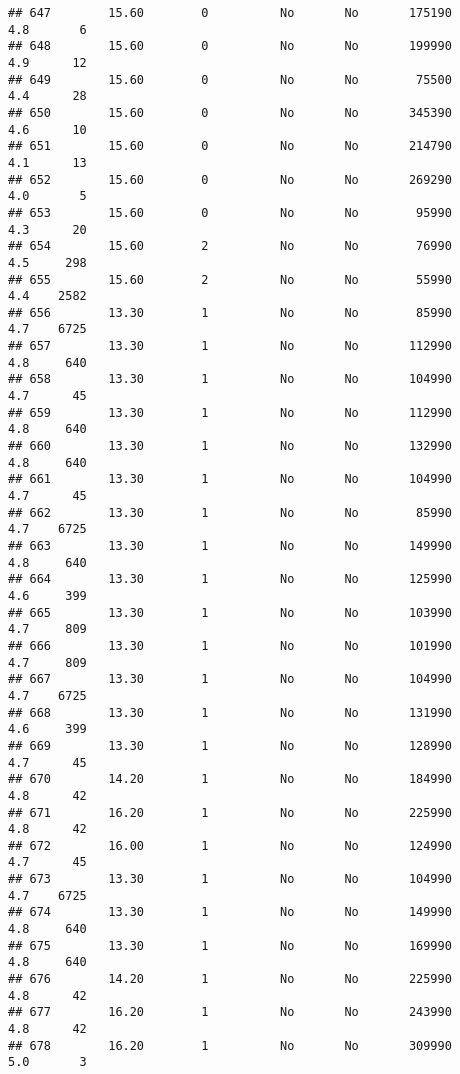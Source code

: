 \documentclass[
]{article}
\begin{document}
\begin{verbatim}
## 647        15.60        0          No       No       175190         4.8       6
## 648        15.60        0          No       No       199990         4.9      12
## 649        15.60        0          No       No        75500         4.4      28
## 650        15.60        0          No       No       345390         4.6      10
## 651        15.60        0          No       No       214790         4.1      13
## 652        15.60        0          No       No       269290         4.0       5
## 653        15.60        0          No       No        95990         4.3      20
## 654        15.60        2          No       No        76990         4.5     298
## 655        15.60        2          No       No        55990         4.4    2582
## 656        13.30        1          No       No        85990         4.7    6725
## 657        13.30        1          No       No       112990         4.8     640
## 658        13.30        1          No       No       104990         4.7      45
## 659        13.30        1          No       No       112990         4.8     640
## 660        13.30        1          No       No       132990         4.8     640
## 661        13.30        1          No       No       104990         4.7      45
## 662        13.30        1          No       No        85990         4.7    6725
## 663        13.30        1          No       No       149990         4.8     640
## 664        13.30        1          No       No       125990         4.6     399
## 665        13.30        1          No       No       103990         4.7     809
## 666        13.30        1          No       No       101990         4.7     809
## 667        13.30        1          No       No       104990         4.7    6725
## 668        13.30        1          No       No       131990         4.6     399
## 669        13.30        1          No       No       128990         4.7      45
## 670        14.20        1          No       No       184990         4.8      42
## 671        16.20        1          No       No       225990         4.8      42
## 672        16.00        1          No       No       124990         4.7      45
## 673        13.30        1          No       No       104990         4.7    6725
## 674        13.30        1          No       No       149990         4.8     640
## 675        13.30        1          No       No       169990         4.8     640
## 676        14.20        1          No       No       225990         4.8      42
## 677        16.20        1          No       No       243990         4.8      42
## 678        16.20        1          No       No       309990         5.0       3

\end{verbatim}
\end{document}
